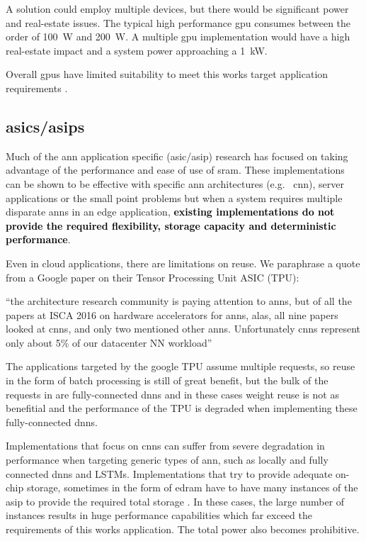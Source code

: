 A solution could employ multiple devices, but there would be significant power and real-estate issues. 
The typical high performance \ac{gpu} consumes between the order of \SI{100}{\watt} and \SI{200}{\watt}.
A multiple \ac{gpu} implementation would have a high real-estate impact and a system power approaching a \SI[per-mode=symbol]{1}{\kilo \watt}.

Overall \acp{gpu} have limited suitability to meet this works target application requirements \cite{dadiannao2017}.


\subsection{\Acp{asic}/\Acp{asip}}
\label{sec:asicAndAsip}
Much of the \ac{ann} application specific (\ac{asic}/\ac{asip}) research has focused on taking advantage of the performance and ease of use of \acf{sram}.
These implementations can be shown to be effective with specific \ac{ann} architectures (e.g. \ \ac{cnn}), server applications or the small point problems but when a system requires multiple disparate \ac{ann}s in an edge application, \textbf{\textcolor{black}{existing implementations do not provide the required flexibility, storage capacity and deterministic performance}}.

Even in cloud applications, there are limitations on reuse. We paraphrase a quote from a Google paper \cite{tensorflow2015-whitepaper} on their Tensor Processing Unit ASIC (TPU):

\hyphenquote{american}{the architecture research community is paying attention to \acp{ann}, but of all the papers at ISCA 2016 on hardware accelerators for \acp{ann}, alas, all nine papers looked at \ac{cnn}s, and only two mentioned other \acp{ann}. 
Unfortunately \ac{cnn}s represent only about 5\% of our datacenter NN workload}

The applications targeted by the google TPU \cite{tensorflow2015-whitepaper} assume multiple requests, so reuse in the form of batch processing is still of great benefit, but the bulk of the requests in \cite{tensorflow2015-whitepaper} are fully-connected \ac{dnn}s and in these cases weight reuse is not as benefitial and the performance of the TPU is degraded when implementing these fully-connected \ac{dnn}s.

Implementations that focus on \ac{cnn}s can suffer from severe degradation in performance when targeting generic types of \ac{ann}, such as locally and fully connected \ac{dnn}s and LSTMs.
Implementations that try to provide adequate on-chip storage, sometimes in the form of \ac{edram} have to have many instances of the \ac{asip} to provide the required total storage \cite{dadiannao2017}. 
In these cases, the large number of instances results in huge performance capabilities which far exceed the requirements of this works application. The total power also becomes prohibitive.


